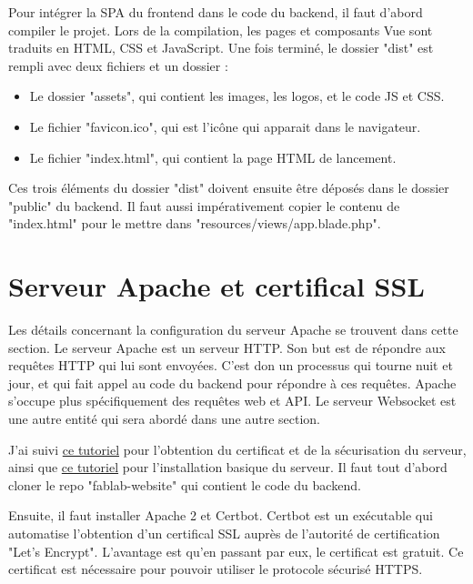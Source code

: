 \documentclass[
    iai, %
    eai, %
]{heig-tb}
\begin{document}
Pour intégrer la SPA du frontend dans le code du backend, il faut d'abord compiler le projet. Lors de la compilation, les pages et composants Vue sont traduits en HTML, CSS et JavaScript.
Une fois terminé, le dossier "dist" est rempli avec deux fichiers et un dossier :
\begin{itemize}
  \item Le dossier "assets", qui contient les images, les logos, et le code JS et CSS.
  \item Le fichier "favicon.ico", qui est l'icône qui apparait dans le navigateur.
  \item Le fichier "index.html", qui contient la page HTML de lancement.
\end{itemize}
\bigskip

Ces trois éléments du dossier "dist" doivent ensuite être déposés dans le dossier "public" du backend. Il faut aussi impérativement copier le contenu de "index.html" pour le mettre dans "resources/views/app.blade.php".

\newpage
\section{Serveur Apache et certifical SSL}
Les détails concernant la configuration du serveur Apache se trouvent dans cette section. Le serveur Apache est un serveur HTTP. Son but est de répondre aux requêtes HTTP qui lui sont envoyées. C'est don un processus qui tourne nuit et jour, et qui fait appel au code du backend pour répondre à ces requêtes. Apache s'occupe plus spécifiquement des requêtes web et API. Le serveur Websocket est une autre entité qui sera abordé dans une autre section.

J'ai suivi \href{https://www.digitalocean.com/community/tutorials/how-to-secure-apache-with-let-s-encrypt-on-ubuntu-20-04}{ce tutoriel} pour l'obtention du certificat et de la sécurisation du serveur, ainsi que \href{https://www.digitalocean.com/community/tutorials/how-to-set-up-apache-virtual-hosts-on-ubuntu-18-04}{ce tutoriel} pour l'installation basique du serveur.
Il faut tout d'abord cloner le repo "fablab-website" qui contient le code du backend.

Ensuite, il faut installer Apache 2 et Certbot. Certbot est un exécutable qui automatise l'obtention d'un certifical SSL auprès de l'autorité de certification "Let's Encrypt". L'avantage est qu'en passant par eux, le certificat est gratuit. Ce certificat est nécessaire pour pouvoir utiliser le protocole sécurisé HTTPS.
\end{document}
